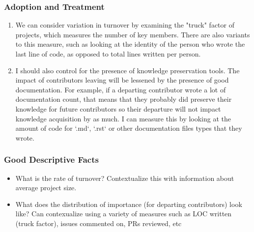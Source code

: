 \documentclass[source/paper/main.tex]{subfiles}
\begin{document}
\subsubsection{Adoption and Treatment}
\begin{enumerate}
    \item We can consider variation in turnover by examining the "truck" factor of projects, which measures the number of key members. There are also variants to this measure, such as looking at the identity of the person who wrote the last line of code, as opposed to total lines written per person. 
    \item I should also control for the presence of knowledge preservation tools. The impact of contributors leaving will be lessened by the presence of good documentation. For example, if a departing contributor wrote a lot of documentation count, that means that they probably did preserve their knowledge for future contributors so their departure will not impact knowledge acquisition by as much. I can measure this by looking at the amount of code for `.md`, `.rst` or other documentation files types that they wrote. 
\end{enumerate}

\subsubsection{Good Descriptive Facts}
\begin{itemize}
    \item What is the rate of turnover? Contextualize this with information about average project size. 
    \item What does the distribution of importance (for departing contributors) look like? Can contexualize using a variety of measures such as LOC written (truck factor), issues commented on, PRs reviewed, etc
\end{itemize}
\end{document}
